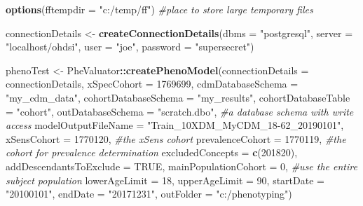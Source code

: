 \documentclass[]{article}
\newenvironment{Shaded}{\begin{snugshade}}{\end{snugshade}}
\newcommand{\CommentTok}[1]{\textcolor[rgb]{0.56,0.35,0.01}{\textit{#1}}}
\newcommand{\DataTypeTok}[1]{\textcolor[rgb]{0.13,0.29,0.53}{#1}}
\newcommand{\DecValTok}[1]{\textcolor[rgb]{0.00,0.00,0.81}{#1}}
\newcommand{\KeywordTok}[1]{\textcolor[rgb]{0.13,0.29,0.53}{\textbf{#1}}}
\newcommand{\NormalTok}[1]{#1}
\newcommand{\OperatorTok}[1]{\textcolor[rgb]{0.81,0.36,0.00}{\textbf{#1}}}
\newcommand{\OtherTok}[1]{\textcolor[rgb]{0.56,0.35,0.01}{#1}}
\newcommand{\StringTok}[1]{\textcolor[rgb]{0.31,0.60,0.02}{#1}}
\begin{document}
\begin{Shaded}
\begin{Highlighting}[]
\KeywordTok{options}\NormalTok{(}\DataTypeTok{fftempdir =} \StringTok{"c:/temp/ff"}\NormalTok{) }\CommentTok{#place to store large temporary files}

\NormalTok{connectionDetails <-}\StringTok{ }\KeywordTok{createConnectionDetails}\NormalTok{(}\DataTypeTok{dbms =} \StringTok{"postgresql"}\NormalTok{,}
                                              \DataTypeTok{server =} \StringTok{"localhost/ohdsi"}\NormalTok{,}
                                              \DataTypeTok{user =} \StringTok{"joe"}\NormalTok{,}
                                              \DataTypeTok{password =} \StringTok{"supersecret"}\NormalTok{)}

\NormalTok{phenoTest <-}\StringTok{ }\NormalTok{PheValuator}\OperatorTok{::}\KeywordTok{createPhenoModel}\NormalTok{(}\DataTypeTok{connectionDetails =}\NormalTok{ connectionDetails,}
                           \DataTypeTok{xSpecCohort =} \DecValTok{1769699}\NormalTok{,}
                           \DataTypeTok{cdmDatabaseSchema =} \StringTok{"my_cdm_data"}\NormalTok{,}
                           \DataTypeTok{cohortDatabaseSchema =} \StringTok{"my_results"}\NormalTok{,}
                           \DataTypeTok{cohortDatabaseTable =} \StringTok{"cohort"}\NormalTok{,}
                           \DataTypeTok{outDatabaseSchema =} \StringTok{"scratch.dbo"}\NormalTok{, }\CommentTok{#a database schema with write access}
                           \DataTypeTok{modelOutputFileName =} \StringTok{"Train_10XDM_MyCDM_18-62_20190101"}\NormalTok{,}
                           \DataTypeTok{xSensCohort =} \DecValTok{1770120}\NormalTok{, }\CommentTok{#the xSens cohort}
                           \DataTypeTok{prevalenceCohort =} \DecValTok{1770119}\NormalTok{, }\CommentTok{#the cohort for prevalence determination}
                           \DataTypeTok{excludedConcepts =} \KeywordTok{c}\NormalTok{(}\DecValTok{201820}\NormalTok{), }
                           \DataTypeTok{addDescendantsToExclude =} \OtherTok{TRUE}\NormalTok{,}
                           \DataTypeTok{mainPopulationCohort =} \DecValTok{0}\NormalTok{, }\CommentTok{#use the entire subject population}
                           \DataTypeTok{lowerAgeLimit =} \DecValTok{18}\NormalTok{, }
                           \DataTypeTok{upperAgeLimit =} \DecValTok{90}\NormalTok{,}
                           \DataTypeTok{startDate =} \StringTok{"20100101"}\NormalTok{,}
                           \DataTypeTok{endDate =} \StringTok{"20171231"}\NormalTok{,}
                           \DataTypeTok{outFolder =} \StringTok{"c:/phenotyping"}\NormalTok{)}
\end{Highlighting}
\end{Shaded}
\end{document}
